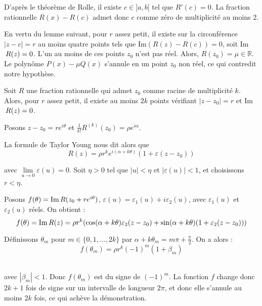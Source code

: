 D'apr{\`e}s le th{\'e}or{\`e}me de Rolle, il existe $c \in] a, b [$ tel que
$R' (c) = 0$. La fraction rationnelle $R (x) - R (c)$ admet donc $c$ comme
z{\'e}ro de multiplicit{\'e} au moins 2.

En vertu du lemme suivant, pour $r$ assez petit, il existe sur la
circonf{\'e}rence $|z - c| = r$ au moins quatre points tels que Im$(R (z) - R
(c)) = 0$, soit Im$\hspace{0.17em} R (z) = 0$. L'un au moins de ces points
$z_0$ n'est pas r{\'e}el. Alors, $R (z_0) = \mu \in \mathbb{R}$. Le
polyn{\^o}me $P (x) - \mu Q (x)$ s'annule en un point $z_0$ non r{\'e}el, ce
qui contredit notre hypoth{\`e}se.


Soit $R$ une fraction rationnelle qui admet $z_0$ comme racine de
multiplicit{\'e} $k$. Alors, pour $r$ assez petit, il existe au moins $2 k$
points v{\'e}rifiant $|z - z_0 | = r$ et Im$\hspace{0.17em} R (z) = 0$.


Posons $z - z_0 = re^{i \theta}$ et $\frac{1}{k!} R^{(k)} (z_0) = \rho e^{i
\alpha}$.

La formule de Taylor Young nous dit alors que
\[ R (z) = \rho r^k e^{i (\alpha + k \theta)}  (1 + \varepsilon (z - z_0)) \]


avec $\underset{u \to 0}{\lim}  \varepsilon (u) = 0$. Soit $\eta > 0$ tel que
$|u| < \eta$ et $| \varepsilon (u) | < 1$, et choisissons $r < \eta$.

Posons $f (\theta) = \text{Im} \hspace{0.17em} R (z_0 + re^{i \theta})$,
$\varepsilon (u) = \varepsilon_1 (u) + i \varepsilon_2 (u)$, avec
$\varepsilon_1 (u)$ et $\varepsilon_2 (u)$ r{\'e}els. On obtient :
\[ f (\theta) = \text{Im} \hspace{0.17em} R (z) = \rho r^k  (\cos (\alpha + k
   \theta) \varepsilon_2 (z - z_0) + \sin (\alpha + k \theta) (1 +
   \varepsilon_2 (z - z_0))) \]


D{\'e}finissons $\theta_m$ pour $m \in \{0, 1, \ldots, 2 k\}$ par $\alpha + k
\theta_m = m \pi + \frac{\pi}{2}$. On a alors :
\[ f (\theta_m) = \rho r^k  (- 1)^m  (1 + \beta_m) \]
\

avec $| \beta_m | < 1$. Donc $f (\theta_m)$ est du signe de $(- 1)^m$. La
fonction $f$ change donc $2 k + 1$ fois de signe sur un intervalle de longueur
$2 \pi$, et donc elle s'annule au moins $2 k$ fois, ce qui ach{\`e}ve la
d{\'e}monstration.


